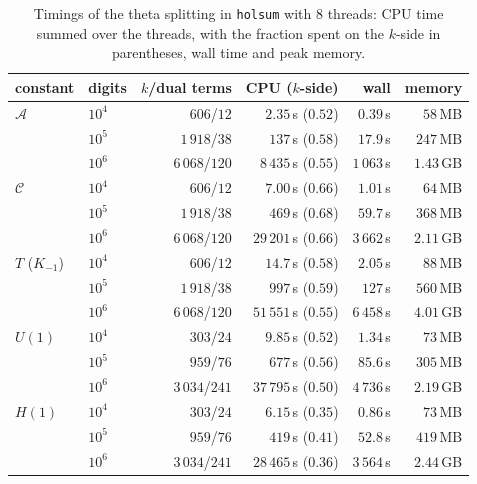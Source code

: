 \documentclass[11pt,reqno]{amsart}
\theoremstyle{definition}
\theoremstyle{remark}
\begin{document}
\begin{table}[tp]
\centering\small
\begin{tabular}{llrrrr}
\toprule
constant & digits & $k$/dual terms & CPU ($k$-side) & wall & memory \\
\midrule
$\mathcal A$ & $10^4$ & $606$/$12$ & $2.35$\,s ($0.52$) & $0.39$\,s & $58$\,MB \\
 & $10^5$ & $1\,918$/$38$ & $137$\,s ($0.58$) & $17.9$\,s & $247$\,MB \\
 & $10^6$ & $6\,068$/$120$ & $8\,435$\,s ($0.55$) & $1\,063$\,s & $1.43$\,GB \\
\midrule
$\mathcal C$ & $10^4$ & $606$/$12$ & $7.00$\,s ($0.66$) & $1.01$\,s & $64$\,MB \\
 & $10^5$ & $1\,918$/$38$ & $469$\,s ($0.68$) & $59.7$\,s & $368$\,MB \\
 & $10^6$ & $6\,068$/$120$ & $29\,201$\,s ($0.66$) & $3\,662$\,s & $2.11$\,GB \\
\midrule
$T$ ($K_{-1}$) & $10^4$ & $606$/$12$ & $14.7$\,s ($0.58$) & $2.05$\,s & $88$\,MB \\
 & $10^5$ & $1\,918$/$38$ & $997$\,s ($0.59$) & $127$\,s & $560$\,MB \\
 & $10^6$ & $6\,068$/$120$ & $51\,551$\,s ($0.55$) & $6\,458$\,s & $4.01$\,GB \\
\midrule
$U(1)$ & $10^4$ & $303$/$24$ & $9.85$\,s ($0.52$) & $1.34$\,s & $73$\,MB \\
 & $10^5$ & $959$/$76$ & $677$\,s ($0.56$) & $85.6$\,s & $305$\,MB \\
 & $10^6$ & $3\,034$/$241$ & $37\,795$\,s ($0.50$) & $4\,736$\,s & $2.19$\,GB \\
\midrule
$H(1)$ & $10^4$ & $303$/$24$ & $6.15$\,s ($0.35$) & $0.86$\,s & $73$\,MB \\
 & $10^5$ & $959$/$76$ & $419$\,s ($0.41$) & $52.8$\,s & $419$\,MB \\
 & $10^6$ & $3\,034$/$241$ & $28\,465$\,s ($0.36$) & $3\,564$\,s & $2.44$\,GB \\
\bottomrule
\end{tabular}
\vspace{\abovecaptionskip}
\caption{Timings of the theta splitting in \texttt{holsum} with $8$ threads: CPU time summed over the threads, with
the fraction spent on the $k$-side in parentheses, wall time and peak memory.}
\label{tab:apps}

\bigskip


\end{table}
\end{document}

